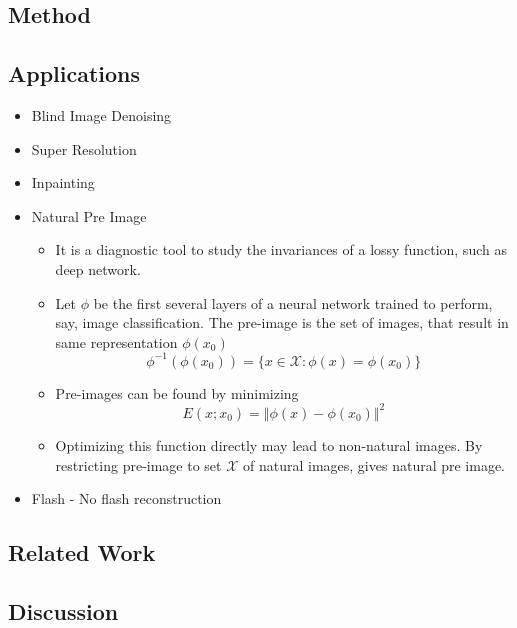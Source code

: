 \documentclass{article}
\begin{document}
    \subsection{Method}\label{subsec:Deep_Image_Prior:method}

    \subsection{Applications}\label{subsec:Deep_Image_Prior:applications}
    \begin{itemize}
        \item Blind Image Denoising
        \item Super Resolution
        \item Inpainting
        \item Natural Pre Image
        \begin{itemize}
            \item It is a diagnostic tool to study the invariances of a lossy function, such as deep network.
            \item Let $\phi$ be the first several layers of a neural network trained to perform, say, image classification.
            The pre-image is the set of images, that result in same representation $\phi(x_0)$
            \[\phi^{-1}(\phi(x_0)) = \{x \in \mathcal{X} : \phi(x) = \phi(x_0)\}\]
            \item Pre-images can be found by minimizing
            \[ E(x;x_0) = \Vert \phi(x) - \phi(x_0) \Vert ^2\]
            \item Optimizing this function directly may lead to non-natural images.
            By restricting pre-image to set $\mathcal{X}$ of natural images, gives natural pre image.
        \end{itemize}
        \item Flash - No flash reconstruction
    \end{itemize}

    \subsection{Related Work}\label{subsec:Deep_Image_Prior:related-work}

    \subsection{Discussion}\label{subsec:Deep_Image_Prior:discussion}
\end{document}
